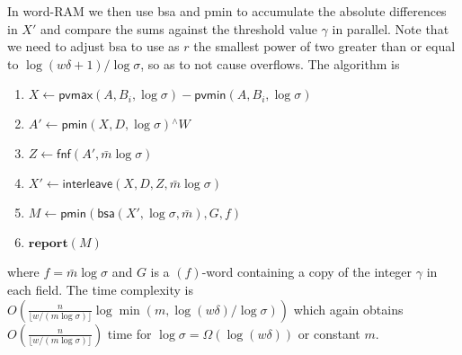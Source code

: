 \documentclass{llncs}
\newcommand{\floor}[1]{\lfloor #1 \rfloor}
\newcommand{\uxor}{\mathrel{^\wedge}}
\newcommand{\fsize}{f}
\newcommand{\word}[1]{#1}
\newcommand{\fword}[1]{$(#1)$-word}
\begin{document}
In word-RAM we then use \textsf{bsa} and \textsf{pmin} to accumulate
the absolute differences in $X'$ and compare the sums against the
threshold value $\gamma$ in parallel. Note that we need to adjust
\textsf{bsa} to use as $r$ the smallest power of two greater than or
equal to $\log(w \delta+1)/\log\sigma$, so as to not cause overflows.
The algorithm is
\begin{enumerate}
\item $\word{X} \leftarrow \textsf{pvmax}(\word{A},\word{B_i},\log\sigma) -
\textsf{pvmin}(\word{A},\word{B_i},\log\sigma)$
\item $\word{A'} \leftarrow \textsf{pmin}(\word{X}, \word{D},\log\sigma) \uxor \word{W}$
\item $\word{Z} \leftarrow \textsf{fnf}(\word{A'}, \bar{m}\log\sigma)$
\item $\word{X'} \leftarrow \textsf{interleave}(\word{X}, \word{D}, \word{Z}, \bar{m}\log\sigma)$
\item $M\leftarrow \textsf{pmin}(\textsf{bsa}(\word{X'}, \log\sigma, \bar{m}), G, \fsize)$
\item $\textbf{report}(M)$
\end{enumerate}
where $\fsize = \bar{m}\log\sigma$ and $\word{G}$ is a \fword{\fsize}
containing a copy of the integer $\gamma$ in each field.
The time complexity is
$O(\frac{n}{\floor{w/(m\log\sigma)}} \log \min(m, \log(w\delta)/\log\sigma))$ which again obtains
$O(\frac{n}{\floor{w/(m\log\sigma)}})$ time for $\log\sigma = \Omega(\log(w\delta))$ or constant $m$.

\medskip
\end{document}
